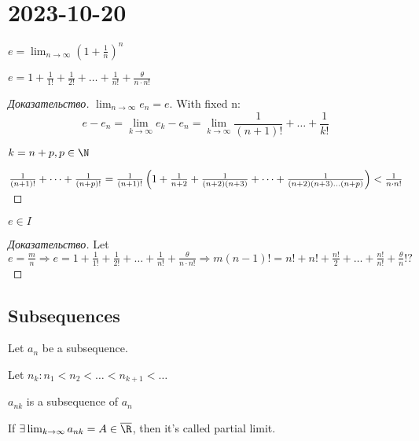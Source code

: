 \section{2023-10-20}

\begin{definition}[]
	$e = \lim_{n \to \infty} \left( 1 + \frac{1}{n} \right) ^n$
\end{definition}

\begin{lemma}
	$e = 1 + \frac{1}{1!} + \frac{1}{2!} + \dots + \frac{1}{n!} + \frac{\theta}{n \cdot n!}$
\end{lemma}
\begin{proof}[Доказательство]
	$\lim_{n \to \infty} e_n = e$. With fixed n: \[
		e - e_n = \lim_{k \to \infty} e_k - e_n = \lim_{k \to \infty} \frac{1}{(n+1)!} + \dots + \frac{1}{k!}
	\]

	$k = n + p, p \in \N$

	$
		\frac{1}{(n+1)!} + \dots + \frac{1}{(n+p)!} = \frac{1}{(n+1)!} \left( 1 + \frac{1}{n+2} + \\ \frac{1}{(n+2)(n+3)} + \dots + \frac{1}{(n+2)(n+3) \dots (n+p)} \right) < \frac{1}{n \cdot n!}
	$
\end{proof}

\begin{corollary}[]
	$e \in I$
\end{corollary}

\begin{proof}[Доказательство]
	Let $e = \frac{m}{n} \Rightarrow e = 1 + \frac{1}{1!} + \frac{1}{2!} + \dots + \frac{1}{n!} + \frac{\theta}{n \cdot n!} \Rightarrow m(n-1)! = n! + n! + \frac{n!}{2} + \dots + \frac{n!}{n!} + \frac{\theta}{n} !?$
\end{proof}

\subsection{Subsequences}

Let $a_n$ be a subsequence.

\begin{definition}[]
	Let $n_k: n_1 < n_2 < \dots < n_{k+1} < \dots $

	$a_{nk}$ is a subsequence of $a_n$
\end{definition}

\begin{definition}[]
	If $\exists \lim_{k \to \infty} a_{nk} = A \in \overline{\R}$, then it's called partial limit.
\end{definition}

